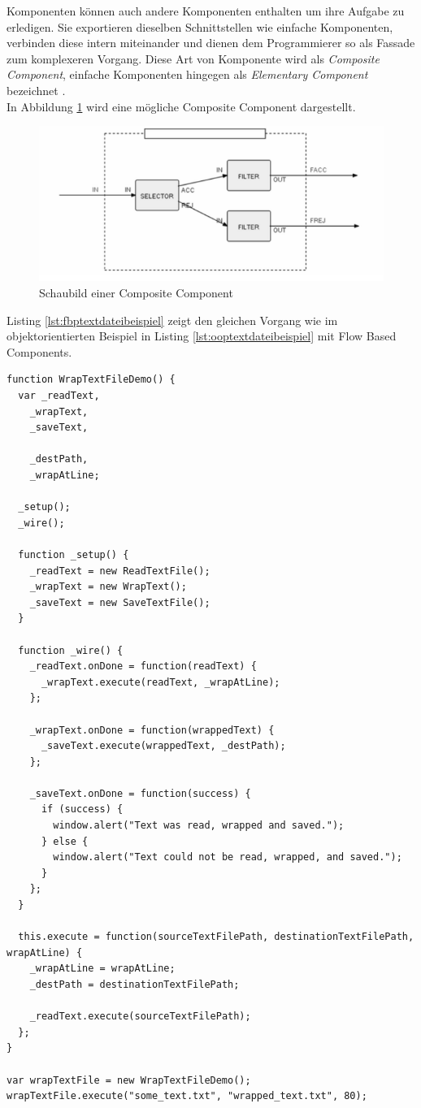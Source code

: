 Komponenten können auch andere Komponenten enthalten um ihre Aufgabe zu erledigen. Sie exportieren dieselben Schnittstellen wie einfache Komponenten, verbinden diese intern miteinander und dienen dem Programmierer so als Fassade zum komplexeren Vorgang. Diese Art von Komponente wird als \textit{Composite Component}, einfache Komponenten hingegen als \textit{Elementary Component} bezeichnet \autocite{FlowBasedProgramming}.\\
In Abbildung \ref{fig:fbpkomponenten} wird eine mögliche Composite Component dargestellt.
\begin{figure}
\centering
\includegraphics{bilder/fbp_components.png}
\caption{Schaubild einer Composite Component \autocite{FlowBasedProgramming}}
\label{fig:fbpkomponenten}
\end{figure}
Listing \ref{lst:fbptextdateibeispiel} zeigt den gleichen Vorgang wie im objektorientierten Beispiel in Listing \ref{lst:ooptextdateibeispiel} mit Flow Based Components.
\lstset{language=JavaScript}
\begin{lstlisting}[caption={Beispiel für das flussbasierte Umbrechen einer Textdatei in JavaScript}, label={lst:fbptextdateibeispiel}]
function WrapTextFileDemo() {
  var _readText,
    _wrapText,
    _saveText,

    _destPath,
    _wrapAtLine;

  _setup();
  _wire();

  function _setup() {
    _readText = new ReadTextFile();
    _wrapText = new WrapText();
    _saveText = new SaveTextFile();
  }

  function _wire() {
    _readText.onDone = function(readText) {
      _wrapText.execute(readText, _wrapAtLine);
    };

    _wrapText.onDone = function(wrappedText) {
      _saveText.execute(wrappedText, _destPath);
    };

    _saveText.onDone = function(success) {
      if (success) {
        window.alert("Text was read, wrapped and saved.");
      } else {
        window.alert("Text could not be read, wrapped, and saved.");
      }
    };
  }

  this.execute = function(sourceTextFilePath, destinationTextFilePath, wrapAtLine) {
    _wrapAtLine = wrapAtLine;
    _destPath = destinationTextFilePath;

    _readText.execute(sourceTextFilePath);
  };
}

var wrapTextFile = new WrapTextFileDemo();
wrapTextFile.execute("some_text.txt", "wrapped_text.txt", 80);
\end{lstlisting}
